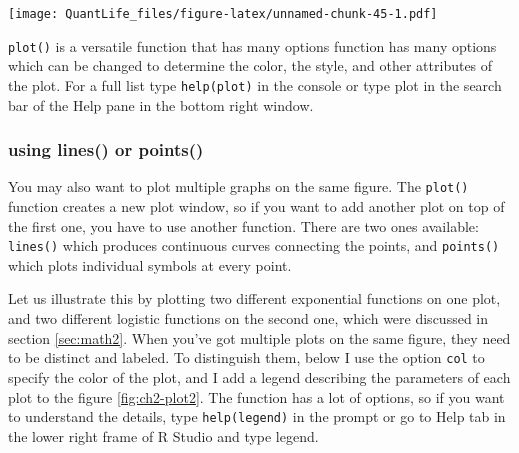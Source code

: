 \documentclass[
]{book}
\theoremstyle{definition}
\theoremstyle{definition}
\theoremstyle{definition}
\theoremstyle{remark}
\begin{document}
\texttt{[image: QuantLife\_files/figure-latex/unnamed-chunk-45-1.pdf]}

\texttt{plot()} is a versatile function that has many options function has many options which can be changed to determine the color, the style, and other attributes of the plot. For a full list type \texttt{help(plot)} in the console or type plot in the search bar of the Help pane in the bottom right window.

\hypertarget{using-lines-or-points}{%
\subsubsection{using lines() or points()}\label{using-lines-or-points}}

You may also want to plot multiple graphs on the same figure. The \texttt{plot()} function creates a new plot window, so if you want to add another plot on top of the first one, you have to use another function. There are two ones available: \texttt{lines()} which produces continuous curves connecting the points, and \texttt{points()} which plots individual symbols at every point.

Let us illustrate this by plotting two different exponential functions on one plot, and two different logistic functions on the second one, which were discussed in section \ref{sec:math2}. When you've got multiple plots on the same figure, they need to be distinct and labeled. To distinguish them, below I use the option \texttt{col} to specify the color of the plot, and I add a legend describing the parameters of each plot to the figure \ref{fig:ch2-plot2}. The function has a lot of options, so if you want to understand the details, type \texttt{help(legend)} in the prompt or go to Help tab in the lower right frame of R Studio and type legend.
\end{document}
